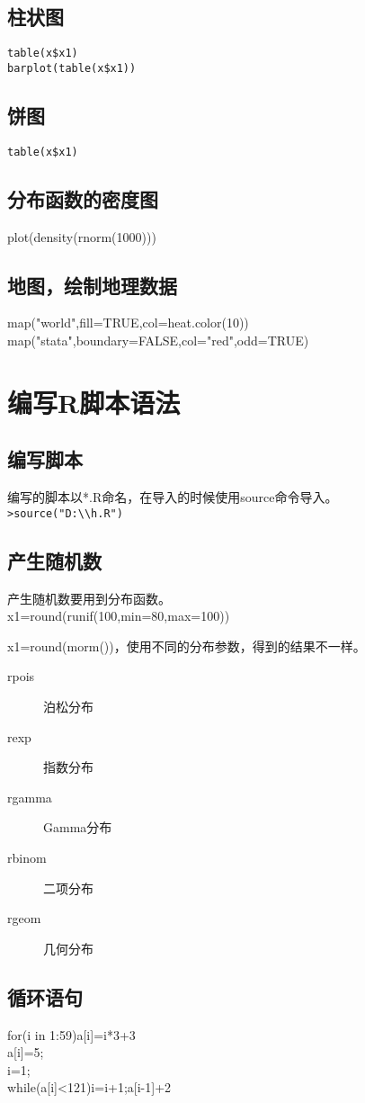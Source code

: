 \documentclass[a4paper,12pt]{ctexbook}
\begin{document}
\begin{flushleft}
\subsection{柱状图}
\verb|table(x$x1)|\\
\verb|barplot(table(x$x1))|

\subsection{饼图}
\verb|table(x$x1)|

\subsection{分布函数的密度图}
plot(density(rnorm(1000)))

\subsection{地图，绘制地理数据}
map("world",fill=TRUE,col=heat.color(10))\\
map("stata",boundary=FALSE,col="red",odd=TRUE)


\section{编写R脚本语法}
\subsection{编写脚本}
编写的脚本以*.R命名，在导入的时候使用source命令导入。\\
\verb|>source("D:\\h.R")|

\subsection{产生随机数}
产生随机数要用到分布函数。\\
x1=round(runif(100,min=80,max=100))

x1=round(morm())，使用不同的分布参数，得到的结果不一样。
\begin{description}
	\item[rpois] 泊松分布
	\item[rexp] 指数分布
	\item[rgamma] Gamma分布
	\item[rbinom] 二项分布
	\item[rgeom] 几何分布
\end{description}

\subsection{循环语句}
for(i in 1:59){a[i]=i*3+3}\\

a[i]=5;\\
i=1;\\
while(a[i]<121){i=i+1;a[i-1]+2}





\end{flushleft}
\end{document}
